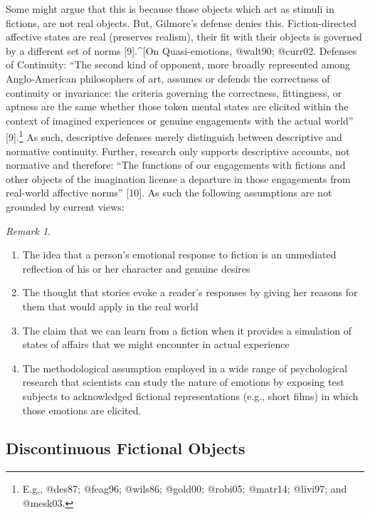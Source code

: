 \documentclass[
  letterpaper,
  DIV=11,
  numbers=noendperiod]{scrartcl}
\providecommand{\tightlist}{%
  \setlength{\itemsep}{0pt}\setlength{\parskip}{0pt}}
\theoremstyle{remark}
\newtheorem*{remark}{Remark}
\begin{document}
Some might argue that this is because those objects which act as stimuli
in fictions, are not real objects. But, Gilmore's defense denies this.
Fiction-directed affective states are real (preserves realism), their
fit with their objects is governed by a different set of norms
{[}9{]}.\^{}{[}On Quasi-emotions, @walt90; @curr02. Defenses of
Continuity: ``The second kind of opponent, more broadly represented
among Anglo-American philosophers of art, assumes or defends the
correctness of continuity or invariance: the criteria governing the
correctness, fittingness, or aptness are the same whether those token
mental states are elicited within the context of imagined experiences or
genuine engagements with the actual world'' {[}9{]}.\footnote{E.g.,
  @des87; @feag96; @wils86; @gold00; @robi05; @matr14; @livi97; and
  @mesk03.} As such, descriptive defenses merely distinguish between
descriptive and normative continuity. Further, research only supports
descriptive accounts, not normative and therefore: ``The functions of
our engagements with fictions and other objects of the imagination
license a departure in those engagements from real-world affective
norms'' {[}10{]}. As such the following assumptions are not grounded by
current views:

\begin{remark}
\leavevmode

\begin{enumerate}
\def\labelenumi{\arabic{enumi}.}
\tightlist
\item
  The idea that a person's emotional response to fiction is an
  unmediated reflection of his or her character and genuine desires
\item
  The thought that stories evoke a reader's responses by giving her
  reasons for them that would apply in the real world
\item
  The claim that we can learn from a fiction when it provides a
  simulation of states of affairs that we might encounter in actual
  experience
\item
  The methodological assumption employed in a wide range of
  psychological research that scientists can study the nature of
  emotions by exposing test subjects to acknowledged fictional
  representations (e.g., short films) in which those emotions are
  elicited.
\end{enumerate}

\end{remark}

\subsection{Discontinuous Fictional
Objects}\label{discontinuous-fictional-objects}
\end{document}
